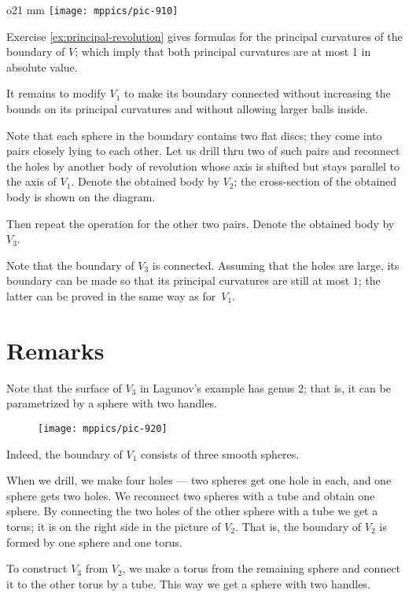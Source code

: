 \begin{wrapfigure}{o}{21 mm}
\vskip-5mm
\centering
\texttt{[image: mppics/pic-910]}
\vskip0mm
\end{wrapfigure}

Exercise \ref{ex:principal-revolution} gives formulas for the principal curvatures of the boundary of $V$;
which imply that both principal curvatures are at most 1 in absolute value. 

It remains to modify $V_1$ to make its boundary connected without increasing the bounds on its principal curvatures and without allowing larger balls inside.

Note that each sphere in the boundary contains two flat discs;
they come into pairs closely lying to each other. 
Let us drill thru two of such pairs and reconnect the holes by another body of revolution whose 
axis is shifted but stays parallel to the axis of $V_1$.
Denote the obtained body by $V_2$; the cross-section of the obtained body is shown on the diagram. 

Then repeat the operation for the other two pairs.
Denote the obtained body by $V_3$.

Note that the boundary of $V_3$ is connected.
Assuming that the holes are large, its boundary can be made so that its principal curvatures are still at most $1$; the latter can be proved in the same way as for~$V_1$.
\qeds

\section*{Remarks}

Note that the surface of $V_3$ in Lagunov's example has genus 2;
that is, it can be parametrized by a sphere with two handles.

\begin{figure}[ht!]
\centering
\vskip-0mm
\texttt{[image: mppics/pic-920]}
\vskip0mm
\end{figure}

Indeed, the boundary of $V_1$ consists of three smooth spheres.

When we drill, we make four holes --- two spheres get one hole in each, and one sphere gets two holes.
We reconnect two spheres with a tube and obtain one sphere.
By connecting the two holes of the other sphere with a tube we get a torus;
it is on the right side in the picture of $V_2$.
That is, the boundary of $V_2$ is formed by one sphere and one torus.

To construct $V_3$ from $V_2$, we make a torus from the remaining sphere and connect it to the other torus by a tube.
This way we get a sphere with two handles.

